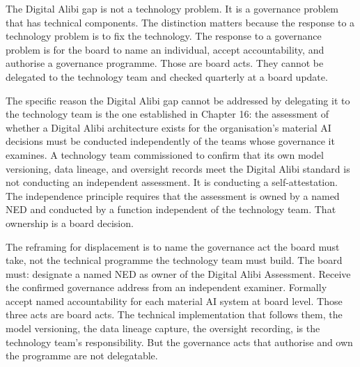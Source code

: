 The Digital Alibi gap is not a technology problem. It is a governance problem that has technical components. The distinction matters because the response to a technology problem is to fix the technology. The response to a governance problem is for the board to name an individual, accept accountability, and authorise a governance programme. Those are board acts. They cannot be delegated to the technology team and checked quarterly at a board update.

The specific reason the Digital Alibi gap cannot be addressed by delegating it to the technology team is the one established in Chapter 16: the assessment of whether a Digital Alibi architecture exists for the organisation's material AI decisions must be conducted independently of the teams whose governance it examines. A technology team commissioned to confirm that its own model versioning, data lineage, and oversight records meet the Digital Alibi standard is not conducting an independent assessment. It is conducting a self-attestation. The independence principle requires that the assessment is owned by a named NED and conducted by a function independent of the technology team. That ownership is a board decision.

The reframing for displacement is to name the governance act the board must take, not the technical programme the technology team must build. The board must: designate a named NED as owner of the Digital Alibi Assessment. Receive the confirmed governance address from an independent examiner. Formally accept named accountability for each material AI system at board level. Those three acts are board acts. The technical implementation that follows them, the model versioning, the data lineage capture, the oversight recording, is the technology team's responsibility. But the governance acts that authorise and own the programme are not delegatable.


